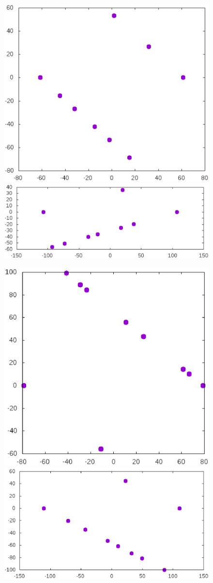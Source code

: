\documentclass[12pt]{article}
\begin{document}
\begin{itemize}
\begin{figure}[htbp]
	\includegraphics[width=.48\linewidth]{Avdeev_9_123_1538485102263.eps}
	\hfill
	\includegraphics[width=.48\linewidth]{Avdeev_9_214_1538495187150.eps}
	\\
	\parbox{.48\linewidth}{\caption{}\label{Avdeev_9_123_1538485102263.eps}}
	\hfill
	\parbox{.48\linewidth}{\caption{}\label{Avdeev_9_214_1538495187150.eps}}
\end{figure}





\begin{figure}[htbp]
	\includegraphics[width=.48\linewidth]{Avdeev_10_158_1538485325776.eps}
	\hfill
	\includegraphics[width=.48\linewidth]{Avdeev_10_222_1538488624864.eps}
	\\
	\parbox{.48\linewidth}{\caption{}\label{F1}}
	\hfill
	\parbox{.48\linewidth}{\caption{}\label{F2}}
\end{figure}

\end{itemize}
\end{document}
